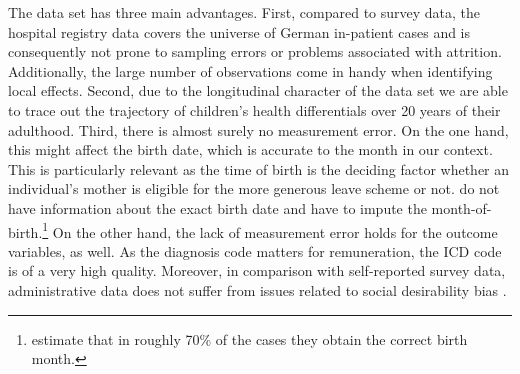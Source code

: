 \documentclass[11pt, a4paper]{article} %
\begin{document}
The data set has three main advantages. First, compared to survey data, the hospital registry data covers the universe of German in-patient cases and is consequently not prone to sampling errors or problems associated with attrition. Additionally, the large number of observations come in handy when identifying local effects. Second, due to the longitudinal character of the data set we are able to trace out the trajectory of children's health differentials over 20 years of their adulthood. Third, there is almost surely no measurement error. On the one hand, this might affect the birth date, which is accurate to the month in our context. This is particularly relevant as the time of birth is the deciding factor whether an individual's mother is eligible for the more generous leave scheme or not. \cite{Dustmann2012} do not have information about the exact birth date and have to impute the month-of-birth.\footnote{\cite{Dustmann2012} estimate that in roughly 70\% of the cases they obtain the correct birth month.} On the other hand, the lack of measurement error holds for the outcome variables, as well. As the diagnosis code matters for remuneration, the ICD code is of a very high quality. Moreover, in comparison with self-reported survey data, administrative data does not suffer from issues related to social desirability bias \citep{marcus2015}.\newline
\end{document}
